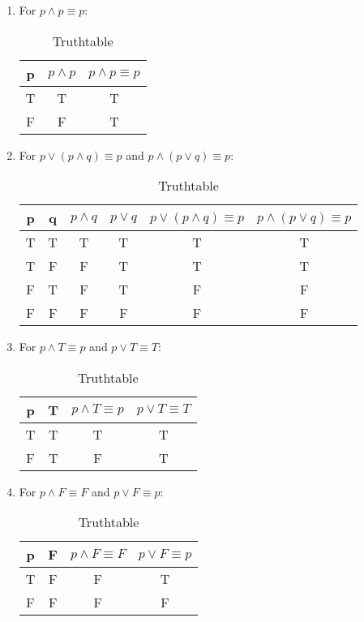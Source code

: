 \documentclass[english,10pt,a4paper]{article}
\begin{document}
\begin{enumerate}[a]
\item For $p \wedge p \equiv p$:
\begin{table}[h]
\centering
	\begin{tabular}{c|c|c}
	\textbf{p} & $p \wedge p$ &\textbf{$p \wedge p \equiv p$} \\\hline
	T & T  & T\\\hline 
	F & F & T
	\end{tabular}
\caption{Truthtable}
\label{tab:title}
\end{table}

\item  For $p \vee (p \wedge q) \equiv p$ and $p \wedge (p \vee q) \equiv p$:
\begin{table}[h]
\centering
	\begin{tabular}{c|c|c|c|c|c}
	\textbf{p} & 
	\textbf{q} & 
	$p \wedge q$ & 
	$p \vee q$ & 
	$p \vee (p \wedge q) \equiv p$ & 
	$p \wedge (p \vee q) \equiv p$ \\\hline
	T & T & T & T & T & T\\\hline 
	T & F & F & T & T & T\\\hline
	F & T & F & T & F & F\\\hline
	F & F & F & F & F & F\\\hline
	\end{tabular}
\caption{Truthtable}
\label{tab:title}
\end{table}

\item For $p \wedge T \equiv p$ and $p \vee T \equiv T$:
\begin{table}[h]
\centering
	\begin{tabular}{c|c|c|c}
	\textbf{p} & 
	\textbf{T} & 
	$p \wedge T \equiv p$ & 
	$p \vee T \equiv T$   \\\hline
	T & T & T & T \\\hline 
	F & T & F & T \\\hline
	\end{tabular}
\caption{Truthtable}
\label{tab:title}
\end{table}


\item For $p \wedge F \equiv F$ and $p \vee F \equiv p$:
\begin{table}[H]
\centering
	\begin{tabular}{c|c|c|c}
	\textbf{p} & 
	\textbf{F} & 
	$p \wedge F \equiv F$ & 
	$p \vee F \equiv p$   \\\hline
	T & F & F & T \\\hline 
	F & F & F & F \\\hline
	\end{tabular}
\caption{Truthtable}
\label{tab:title}
\end{table}
\end{enumerate}
\end{document}
